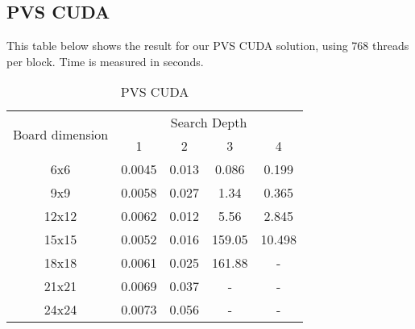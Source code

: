 

\subsection{PVS CUDA}
This table below shows the result for our PVS CUDA solution, using 768 threads per block. Time is measured in seconds.\\
\begin{table}[!htbp]
\centering
\begin{tabular}{|c|c|c|c|c|} 
\hline
\multirow{2}{*}{Board dimension} & \multicolumn{4}{c|}{Search Depth}     \\ 
\cline{2-5}
                                 & 1       & 2      & 3       & 4        \\ 
\hline
6x6                              & 0.0045 & 0.013 & 0.086  & 0.199    \\ 
\hline
9x9                              & 0.0058 & 0.027 & 1.34   & 0.365   \\ 
\hline
12x12                            & 0.0062 & 0.012 & 5.56   & 2.845  \\ 
\hline
15x15                            & 0.0052 & 0.016 & 159.05 & 10.498        \\ 
\hline
18x18                            & 0.0061 & 0.025 & 161.88 & -        \\ 
\hline
21x21                            & 0.0069 & 0.037 & -      & -        \\ 
\hline
24x24                            & 0.0073 & 0.056 & -      & -        \\
\hline
\end{tabular}
\caption{PVS CUDA}
\end{table}

